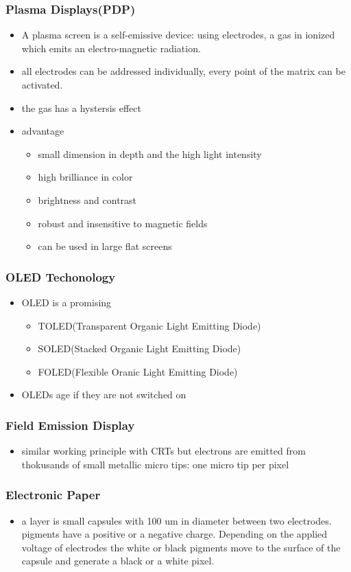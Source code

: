 \documentclass{standalone}
\begin{document}
\subsubsection*{Plasma Displays(PDP)}
\begin{itemize}
\item A plasma screen is a self-emissive device: using electrodes, a gas in ionized which emits an electro-magnetic radiation.
\item all electrodes can be addressed individually, every point of the matrix can be activated.
\item the gas has a hystersis effect
\item advantage
\begin{itemize}
\item small dimension in depth and the high light intensity
\item high brilliance in color
\item brightness and contrast
\item robust and insensitive to magnetic fields
\item can be used in large flat screens
\end{itemize} 
\end{itemize}
\subsubsection*{OLED Techonology}
\begin{itemize}
\item OLED is a promising
\begin{itemize}
\item TOLED(Transparent Organic Light Emitting Diode)
\item SOLED(Stacked Organic Light Emitting Diode)
\item FOLED(Flexible Oranic Light Emitting Diode)
\end{itemize}
\item OLEDs age if they are not switched on
\end{itemize}
\subsubsection*{Field Emission Display}
\begin{itemize}
\item similar working principle with CRTs but electrons are emitted from thokusands of small metallic micro tips: one micro tip per pixel
\end{itemize}
\subsubsection*{Electronic Paper}
\begin{itemize}
\item a layer is small capsules with 100 um in diameter between two electrodes. pigments have a positive or a negative charge. Depending on the applied voltage of electrodes the white or black pigments move to the surface of the capsule and generate a black or a white pixel. 
\end{itemize}
\end{document}
